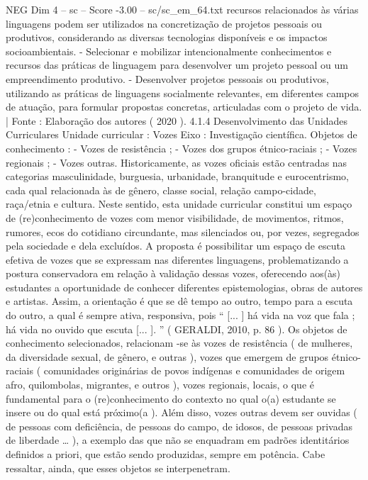 \begin{textsample}{NEG Dim 4 – sc – Score -3.00 – sc/sc\_em\_64.txt}
recursos relacionados às várias linguagens podem ser utilizados na concretização de projetos pessoais ou produtivos, considerando as diversas tecnologias disponíveis e os impactos socioambientais. - Selecionar e mobilizar intencionalmente conhecimentos e recursos das práticas de linguagem para desenvolver um projeto pessoal ou um empreendimento produtivo. - Desenvolver projetos pessoais ou produtivos, utilizando as práticas de linguagens socialmente relevantes, em diferentes campos de atuação, para formular propostas concretas, articuladas com o projeto de vida. | Fonte : Elaboração dos autores ( 2020 ). 4.1.4 Desenvolvimento das Unidades Curriculares Unidade curricular : Vozes Eixo : Investigação científica.
Objetos de conhecimento : - Vozes de resistência ; - Vozes dos grupos étnico-raciais ; - Vozes regionais ; - Vozes outras.
Historicamente, as vozes oficiais estão centradas nas categorias masculinidade, burguesia, urbanidade, branquitude e eurocentrismo, cada qual relacionada às de gênero, classe social, relação campo-cidade, raça/etnia e cultura.
Neste sentido, esta unidade curricular constitui um espaço de (re)conhecimento de vozes com menor visibilidade, de movimentos, ritmos, rumores, ecos do cotidiano circundante, mas silenciados ou, por vezes, segregados pela sociedade e dela excluídos.
A proposta é possibilitar um espaço de escuta efetiva de vozes que se expressam nas diferentes linguagens, problematizando a postura conservadora em relação à validação dessas vozes, oferecendo aos(às) estudantes a oportunidade de conhecer diferentes epistemologias, obras de autores e artistas.
Assim, a orientação é que se dê tempo ao outro, tempo para a escuta do outro, a qual é sempre ativa, responsiva, pois “ [... ] há vida na voz que fala ; há vida no ouvido que escuta [... ]. ” ( GERALDI, 2010, p. 86 ).
Os objetos de conhecimento selecionados, relacionam -se às vozes de resistência ( de mulheres, da diversidade sexual, de gênero, e outras ), vozes que emergem de grupos étnico-raciais ( comunidades originárias de povos indígenas e comunidades de origem afro, quilombolas, migrantes, e outros ), vozes regionais, locais, o que é fundamental para o (re)conhecimento do contexto no qual o(a) estudante se insere ou do qual está próximo(a ).
Além disso, vozes outras devem ser ouvidas ( de pessoas com deficiência, de pessoas do campo, de idosos, de pessoas privadas de liberdade … ), a exemplo das que não se enquadram em padrões identitários definidos a priori, que estão sendo produzidas, sempre em potência.
Cabe ressaltar, ainda, que esses objetos se interpenetram.

\end{textsample}
